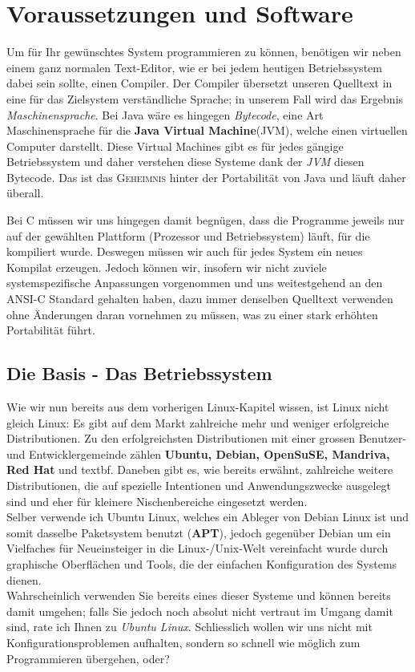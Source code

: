 \documentclass[b5paper,10pt,dvips,fleqn,titlepage,twoside]{book}
\begin{document}
\chapter{Voraussetzungen und Software}
Um für Ihr gewünschtes System programmieren zu können, benötigen wir neben einem ganz normalen Text-Editor, wie er bei jedem heutigen Betriebssystem dabei sein sollte, einen Compiler. Der Compiler übersetzt unseren Quelltext in eine für das Zielsystem verständliche Sprache; in unserem Fall wird das Ergebnis \emph{Maschinensprache}. Bei Java wäre es hingegen \emph{Bytecode}, eine Art Maschinensprache für die \textbf{Java Virtual Machine}(JVM), welche einen virtuellen Computer darstellt. Diese Virtual Machines gibt es für jedes gängige Betriebssystem und daher verstehen diese Systeme dank der \emph{JVM} diesen Bytecode. Das ist das \textsc{Geheimnis} hinter der Portabilität von Java und läuft daher überall. \newline

Bei C müssen wir uns hingegen damit begnügen, dass die Programme jeweils nur auf der gewählten Plattform (Prozessor und Betriebssystem)  läuft, für die kompiliert wurde. Deswegen müssen wir auch für jedes System ein neues Kompilat erzeugen. Jedoch können wir, insofern wir nicht zuviele systemspezifische Anpassungen vorgenommen und uns weitestgehend an den ANSI-C Standard gehalten haben, dazu immer denselben Quelltext verwenden ohne Änderungen daran vornehmen zu müssen, was zu einer stark erhöhten Portabilität führt.
\\\newline
\section{Die Basis - Das Betriebssystem}
Wie wir nun bereits aus dem vorherigen Linux-Kapitel wissen, ist Linux nicht gleich Linux: Es gibt auf dem Markt zahlreiche mehr und weniger erfolgreiche Distributionen. Zu den erfolgreichsten Distributionen mit einer grossen Benutzer- und Entwicklergemeinde zählen \textbf{Ubuntu, Debian, OpenSuSE, Mandriva, Red Hat} und {textbf}. Daneben gibt es, wie bereits erwähnt, zahlreiche weitere Distributionen, die auf spezielle Intentionen und Anwendungszwecke ausgelegt sind und eher für kleinere Nischenbereiche eingesetzt werden.\\
Selber verwende ich Ubuntu Linux, welches ein Ableger von Debian Linux ist und somit dasselbe Paketsystem benutzt (\textbf{APT}), jedoch gegenüber Debian um ein Vielfaches für Neueinsteiger in die Linux-/Unix-Welt vereinfacht wurde durch graphische Oberflächen und Tools, die der einfachen Konfiguration des Systems dienen.\\
Wahrscheinlich verwenden Sie bereits eines dieser Systeme und können bereits damit umgehen; falls Sie jedoch noch absolut nicht vertraut im Umgang damit sind, rate ich Ihnen zu \emph{Ubuntu Linux}. Schliesslich wollen wir uns nicht mit Konfigurationsproblemen aufhalten, sondern so schnell wie möglich zum Programmieren übergehen, oder?
\\
\end{document}
